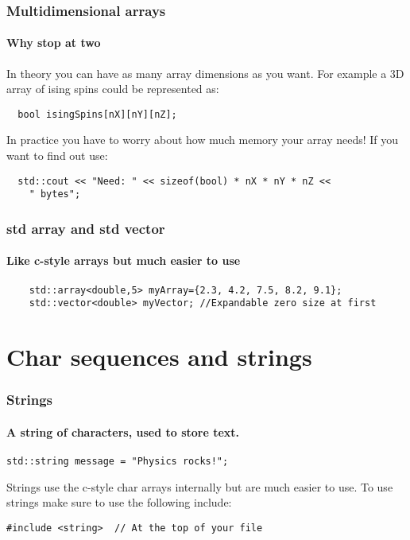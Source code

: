 \documentclass{beamer}
\begin{document}
\begin{frame}[fragile]
  \frametitle{Multidimensional arrays}
  \framesubtitle{Why stop at two}
  In theory you can have as many array dimensions as you want.  For example a 3D array of ising spins could be represented as:
  \begin{lstlisting}
  bool isingSpins[nX][nY][nZ];
  \end{lstlisting}
  In practice you have to worry about how much memory your array needs!\pause{}  If you want to find out use:
  \begin{lstlisting}
  std::cout << "Need: " << sizeof(bool) * nX * nY * nZ <<
    " bytes";
  \end{lstlisting}

\end{frame}

\begin{frame}
	\frametitle{std array and std vector}
	\framesubtitle{Like c-style arrays but much easier to use}
	\begin{lstlisting}
	std::array<double,5> myArray={2.3, 4.2, 7.5, 8.2, 9.1};
	std::vector<double> myVector; //Expandable zero size at first
	\end{lstlisting}
\end{frame}

\section{Char sequences and strings}


\begin{frame}[fragile]
  \frametitle{Strings}
  \framesubtitle{A string of characters, used to store text.}
  
  \begin{lstlisting}
std::string message = "Physics rocks!";
  \end{lstlisting}
  Strings use the c-style char arrays internally but are much easier to use.
  To use strings make sure to use the following include:
  \begin{lstlisting}
#include <string>  // At the top of your file
  \end{lstlisting}
\end{frame}
\end{document}

